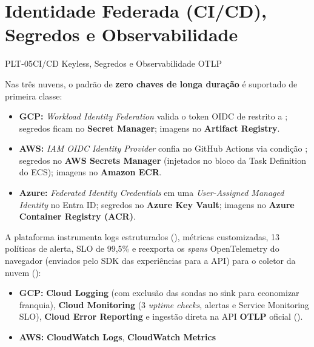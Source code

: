 \section{Identidade Federada (CI/CD), Segredos e Observabilidade}

\begin{pecaarq}{PLT-05}{CI/CD Keyless, Segredos e Observabilidade OTLP}{\sgcp~\nativo\enspace\saws~\nativo\enspace\sazure~\nativo}
\begin{campos}
  \item[Identidade e Segredos] Nas três nuvens, o padrão de \textbf{zero chaves
    de longa duração} é suportado de primeira classe:
    \begin{itemize}
      \item \textbf{GCP:} \emph{Workload Identity Federation} valida o token OIDC
        de  restrito a
        ; segredos ficam no \textbf{Secret Manager};
        imagens no \textbf{Artifact Registry}.
      \item \textbf{AWS:} \emph{IAM OIDC Identity Provider} confia no GitHub
        Actions via condição ;
        segredos no \textbf{AWS Secrets Manager} (injetados no bloco 
        da Task Definition do ECS); imagens no \textbf{Amazon ECR}.
      \item \textbf{Azure:} \emph{Federated Identity Credentials} em uma
        \emph{User-Assigned Managed Identity} no Entra ID; segredos no
        \textbf{Azure Key Vault}; imagens no \textbf{Azure Container Registry
        (ACR)}.
    \end{itemize}
  \item[Observabilidade e OTLP] A plataforma instrumenta logs estruturados
    (), métricas customizadas, 13 políticas de alerta, SLO de 99,5\% e
    reexporta os \emph{spans} OpenTelemetry do navegador (enviados pelo SDK das
    experiências para a API) para o coletor da nuvem ():
    \begin{itemize}
      \item \textbf{GCP:} \textbf{Cloud Logging} (com exclusão das sondas no sink
         para economizar franquia), \textbf{Cloud Monitoring} (3
        \emph{uptime checks}, alertas e Service Monitoring SLO), \textbf{Cloud
        Error Reporting} e ingestão direta na API \textbf{OTLP} oficial
        ().
      \item \textbf{AWS:} \textbf{CloudWatch Logs}, \textbf{CloudWatch Metrics
}
\end{itemize}
\end{campos}
\end{pecaarq}
